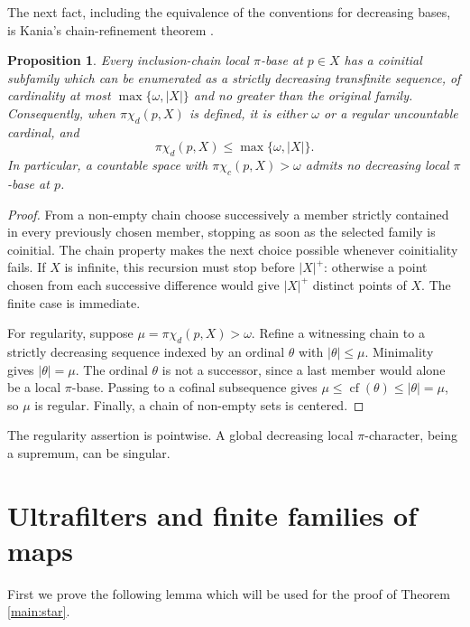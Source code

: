 \documentclass[10pt,a4paper]{amsart}
\newtheorem{proposition}[theorem]{Proposition}
\theoremstyle{definition}
\theoremstyle{remark}
\newcommand{\pcc}{\pi\chi_c}
\newcommand{\pcd}{\pi\chi_d}
\DeclareMathOperator{\cf}{cf}
\begin{document}
The next fact, including the equivalence of the conventions for decreasing bases, is Kania's chain-refinement theorem \cite[Theorem B and Corollary 2.2]{Kania}.

\begin{proposition}\label{prop:chains}
Every inclusion-chain local $\pi$-base at $p\in X$ has a coinitial subfamily which can be enumerated as a strictly decreasing transfinite sequence, of cardinality at most $\max\{\omega,|X|\}$ and no greater than the original family. Consequently, when $\pcd(p,X)$ is defined, it is either $\omega$ or a regular uncountable cardinal, and
\[
\pcd(p,X)\leqslant\max\{\omega,|X|\}.
\]
In particular, a countable space with $\pcc(p,X)>\omega$ admits no decreasing local $\pi$-base at $p$.
\end{proposition}
\begin{proof}
From a non-empty chain choose successively a member strictly contained in every previously chosen member, stopping as soon as the selected family is coinitial. The chain property makes the next choice possible whenever coinitiality fails. If $X$ is infinite, this recursion must stop before $|X|^+$: otherwise a point chosen from each successive difference would give $|X|^+$ distinct points of $X$. The finite case is immediate.

For regularity, suppose $\mu=\pcd(p,X)>\omega$. Refine a witnessing chain to a strictly decreasing sequence indexed by an ordinal $\theta$ with $|\theta|\leqslant\mu$. Minimality gives $|\theta|=\mu$. The ordinal $\theta$ is not a successor, since a last member would alone be a local $\pi$-base. Passing to a cofinal subsequence gives $\mu\leqslant\cf(\theta)\leqslant|\theta|=\mu$, so $\mu$ is regular. Finally, a chain of non-empty sets is centered.
\end{proof}

The regularity assertion is pointwise. A global decreasing local $\pi$-character, being a supremum, can be singular.


\section{Ultrafilters and finite families of maps}
First we prove the following lemma which will be used for the proof of Theorem \ref{main:star}.
\end{document}
